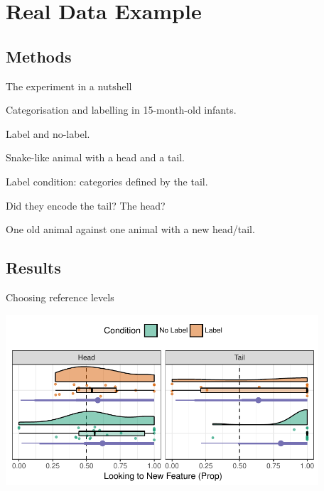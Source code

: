 \documentclass{beamer}
\begin{document}
\section{Real Data Example}

\subsection{Methods}

\begin{frame}{The experiment in a nutshell}

  Categorisation and labelling in 15-month-old infants.
  \vspace{2em}
  \begin{description}
    \pause\item[\hspace{37.5pt}Conditions] Label and no-label.
    \pause\item[\hspace{20pt}Familiarisation] Snake-like animal with a head and a tail.
    
    Label condition: categories defined by the tail.
    \pause\item[Novelty Preference] Did they encode the tail? The head?
    
    One old animal against one animal with a new head/tail.
  \end{description}

\end{frame}

\subsection{Results}

\begin{frame}{Choosing reference levels}

  \begin{center}
    \includegraphics[height=2.5in]{SalDi-old_new.pdf}
  \end{center}

\end{frame}
\end{document}
